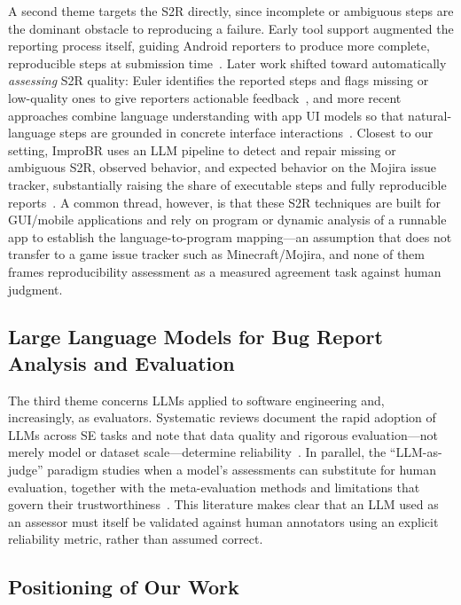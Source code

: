 A second theme targets the S2R directly, since incomplete or ambiguous steps are
the dominant obstacle to reproducing a failure. Early tool support augmented the
reporting process itself, guiding Android reporters to produce more complete,
reproducible steps at submission time~\cite{moran2015autocompleting}. Later work
shifted toward automatically \emph{assessing} S2R quality: Euler identifies the
reported steps and flags missing or low-quality ones to give reporters
actionable feedback~\cite{chaparro2019assessing}, and more recent approaches
combine language understanding with app UI models so that natural-language steps
are grounded in concrete interface interactions~\cite{mahmud2025combining}.
Closest to our setting, ImproBR uses an LLM pipeline to detect and repair
missing or ambiguous S2R, observed behavior, and expected behavior on the Mojira
issue tracker, substantially raising the share of executable steps and fully
reproducible reports~\cite{akyol2026improbr}. A common thread, however, is that
these S2R techniques are built for GUI/mobile applications and rely on program
or dynamic analysis of a runnable app to establish the language-to-program
mapping---an assumption that does not transfer to a game issue tracker such as
Minecraft/Mojira, and none of them frames reproducibility assessment as a
measured agreement task against human judgment.

\subsection{Large Language Models for Bug Report Analysis and Evaluation}
\label{sec:related:llm}

The third theme concerns LLMs applied to software engineering and, increasingly,
as evaluators. Systematic reviews document the rapid adoption of LLMs across SE
tasks and note that data quality and rigorous evaluation---not merely model or
dataset scale---determine reliability~\cite{hou2024llm4se}. In parallel, the
``LLM-as-judge'' paradigm studies when a model's assessments can substitute for
human evaluation, together with the meta-evaluation methods and limitations that
govern their trustworthiness~\cite{li2024judges}. This literature makes clear
that an LLM used as an assessor must itself be validated against human
annotators using an explicit reliability metric, rather than assumed correct.

\subsection{Positioning of Our Work}
\label{sec:related:positioning}

